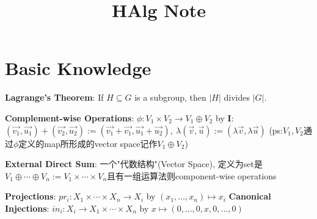 \documentclass[9pt]{article}
\title{HAlg Note}
\author{}
\date{}
\begin{document}
\newcommand{\bij}{\stackrel{\sim}{\to}}
\newcommand{\oto}{\hookrightarrow}
\newcommand{\onto}{\twoheadrightarrow}

\newcommand{\np}{{\tiny $^{^{^\ominus}}$}}

\newcommand{\N}{\mathbb{N}}

\maketitle
\thispagestyle{fancy}
\vspace{-3.5cm}

\fontsize{10pt}{11pt}\selectfont
\setlength{\parindent}{8pt}


\section{Basic Knowledge} %

\textbf{Lagrange's Theorem}: {\small If $H\subseteq G$ is a subgroup, then $|H|$ divides $|G|$.} \quad {}

\textbf{\small Complement-wise Operations}: {\scriptsize $\phi:V_1\times V_2\to V_1\oplus V_2$ by \textbf{I}:$(\vec{v_1},\vec{u_1})+(\vec{v_2},\vec{u_2}):=(\vec{v_1}+\vec{v_1},\vec{u_1}+\vec{u_2}), \ \lambda(\vec{v},\vec{u}):=(\lambda\vec{v},\lambda\vec{u})$ {\tiny (ps:$V_1,V_2$通过$\phi$定义的map所形成的vector space记作$V_1\oplus V_2$)}}

\textbf{External Direct Sum}: {\small 一个"代数结构"(Vector Space), 定义为set是$V_1\oplus\cdots\oplus V_n:=V_1\times\cdots\times V_n$且有一组运算法则component-wise operations}

\textbf{Projections}: $pr_i:X_1\times\cdots\times X_n\to X_i$ by $(x_1,...,x_n)\mapsto x_i$ \quad \textbf{Canonical Injections}: $in_i:X_i\to X_1\times\cdots\times X_n$ by $x\mapsto(0,...,0,x,0,...,0)$
\end{document}
